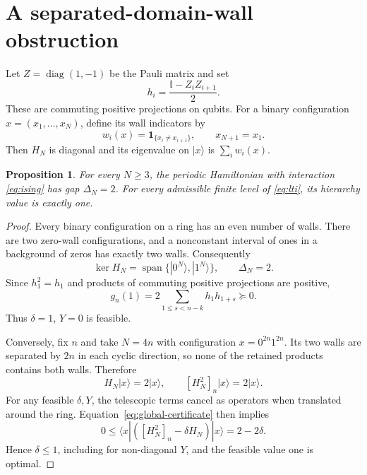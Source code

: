 \documentclass{article}
\newtheorem{proposition}{Proposition}
\newcommand{\id}{\mathbb I}
\begin{document}
\section{A separated-domain-wall obstruction}
\label{sec:obstruction}

Let $Z=\operatorname{diag}(1,-1)$ be the Pauli matrix and set
\begin{equation}
  h_i=\frac{\id-Z_iZ_{i+1}}2.
  \label{eq:ising}
\end{equation}
These are commuting positive projections on qubits. For a binary
configuration $x=(x_1,\ldots,x_N)$, define its wall indicators by
\begin{equation}
  w_i(x)=\boldsymbol{1}_{\{x_i\neq x_{i+1}\}},
  \qquad x_{N+1}=x_1.
\end{equation}
Then $H_N$ is diagonal and its eigenvalue on $|x\rangle$ is
$\sum_iw_i(x)$.

\begin{proposition}
For every $N\geq3$, the periodic Hamiltonian with interaction
\eqref{eq:ising} has gap $\Delta_N=2$. For every admissible finite
level of \eqref{eq:lti}, its hierarchy value is exactly one.
\end{proposition}
\begin{proof}
Every binary configuration on a ring has an even number of walls.
There are two zero-wall configurations, and a nonconstant interval of
ones in a background of zeros has exactly two walls. Consequently
\begin{equation}
  \ker H_N=\operatorname{span}\{|0^N\rangle,|1^N\rangle\},
  \qquad \Delta_N=2.
\end{equation}
Since $h_1^2=h_1$ and products of commuting positive projections are
positive,
\begin{equation}
  g_n(1)=2\sum_{1\leq s<n-k}h_1h_{1+s}\succeq0.
\end{equation}
Thus $\delta=1$, $Y=0$ is feasible.

Conversely, fix $n$ and take $N=4n$ with configuration
$x=0^{2n}1^{2n}$. Its two walls are separated by $2n$ in each cyclic
direction, so none of the retained products contains both walls.
Therefore
\begin{equation}
  H_N|x\rangle=2|x\rangle,
  \qquad [H_N^2]_n|x\rangle=2|x\rangle.
\end{equation}
For any feasible $\delta,Y$, the telescopic terms cancel as operators
when translated around the ring. Equation~\eqref{eq:global-certificate}
then implies
\begin{equation}
  0\leq\langle x|([H_N^2]_n-\delta H_N)|x\rangle
  =2-2\delta.
\end{equation}
Hence $\delta\leq1$, including for non-diagonal $Y$, and the feasible
value one is optimal.
\end{proof}
\end{document}
